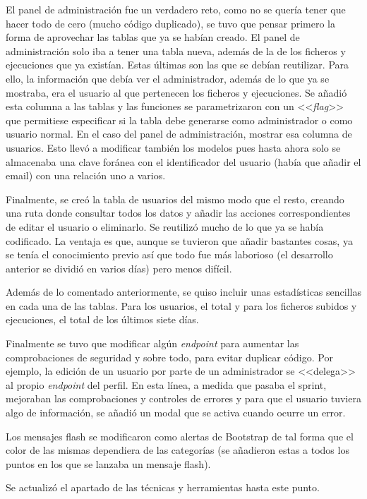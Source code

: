 El panel de administración fue un verdadero reto, como no se quería tener que
hacer todo de cero (mucho código duplicado), se tuvo que pensar primero la forma
de aprovechar las tablas que ya se habían creado. El panel de administración
solo iba a tener una tabla nueva, además de la de los ficheros y ejecuciones que
ya existían. Estas últimas son las que se debían reutilizar. Para ello, la
información que debía ver el administrador, además de lo que ya se mostraba, era
el usuario al que pertenecen los ficheros y ejecuciones. Se añadió esta columna
a las tablas y las funciones se parametrizaron con un <<\textit{flag}>> que
permitiese especificar si la tabla debe generarse como administrador o como
usuario normal. En el caso del panel de administración, mostrar esa columna de
usuarios. Esto llevó a modificar también los modelos pues hasta ahora solo se
almacenaba una clave foránea con el identificador del usuario (había que añadir
el email) con una relación uno a varios.

Finalmente, se creó la tabla de usuarios del mismo modo que el resto, creando
una ruta donde consultar todos los datos y añadir las acciones correspondientes
de editar el usuario o eliminarlo. Se reutilizó mucho de lo que ya se había
codificado. La ventaja es que, aunque se tuvieron que añadir bastantes cosas, ya
se tenía el conocimiento previo así que todo fue más laborioso (el desarrollo
anterior se dividió en varios días) pero menos difícil.

Además de lo comentado anteriormente, se quiso incluir unas estadísticas
sencillas en cada una de las tablas. Para los usuarios, el total y para los
ficheros subidos y ejecuciones, el total de los últimos siete días.

Finalmente se tuvo que modificar algún \textit{endpoint} para aumentar las
comprobaciones de seguridad y sobre todo, para evitar duplicar código. Por
ejemplo, la edición de un usuario por parte de un administrador se <<delega>> al
propio \textit{endpoint} del perfil. En esta línea, a medida que pasaba el
sprint, mejoraban las comprobaciones y controles de errores y para que el
usuario tuviera algo de información, se añadió un modal que se activa cuando
ocurre un error.

Los mensajes flash se modificaron como alertas de Bootstrap de tal forma que el
color de las mismas dependiera de las categorías (se añadieron estas a todos los
puntos en los que se lanzaba un mensaje flash).

Se actualizó el apartado de las técnicas y herramientas hasta este punto.

